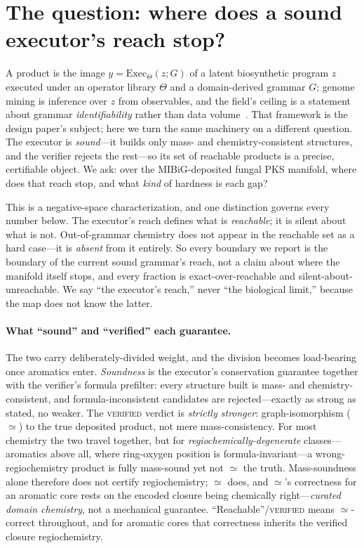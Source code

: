\documentclass[11pt]{article}
\begin{document}
\section{The question: where does a sound executor's reach stop?}
\label{sec:framing}
A product is the image $y=\mathrm{Exec}_{\Theta}(z;G)$ of a latent biosynthetic program $z$ executed
under an operator library $\Theta$ and a domain-derived grammar $G$; genome mining is inference over
$z$ from observables, and the field's ceiling is a statement about grammar \emph{identifiability}
rather than data volume~\citep{eilertsen2026preprint}. That framework is the design paper's subject;
here we turn the same machinery on a different question. The executor is \emph{sound}---it builds only
mass- and chemistry-consistent structures, and the verifier rejects the rest---so its set of reachable
products is a precise, certifiable object. We ask: over the MIBiG-deposited fungal PKS manifold, where
does that reach stop, and what \emph{kind} of hardness is each gap?

This is a negative-space characterization, and one distinction governs every number below. The
executor's reach defines what is \emph{reachable}; it is silent about what is not. Out-of-grammar
chemistry does not appear in the reachable set as a hard case---it is \emph{absent} from it entirely.
So every boundary we report is the boundary of the current sound grammar's reach, not a claim about
where the manifold itself stops, and every fraction is exact-over-reachable and silent-about-unreachable.
We say ``the executor's reach,'' never ``the biological limit,'' because the map does not know the latter.

\paragraph{What ``sound'' and ``verified'' each guarantee.} The two carry deliberately-divided weight,
and the division becomes load-bearing once aromatics enter. \emph{Soundness} is the executor's
conservation guarantee together with the verifier's formula prefilter: every structure built is mass-
and chemistry-consistent, and formula-inconsistent candidates are rejected---exactly as strong as
stated, no weaker. The \textsc{verified} verdict is \emph{strictly stronger}: graph-isomorphism
($\simeq$) to the true deposited product, not mere mass-consistency. For most chemistry the two travel
together, but for \emph{regiochemically-degenerate} classes---aromatics above all, where ring-oxygen
position is formula-invariant---a wrong-regiochemistry product is fully mass-sound yet not $\simeq$ the
truth. Mass-soundness alone therefore does not certify regiochemistry; $\simeq$ does, and $\simeq$'s
correctness for an aromatic core rests on the encoded closure being chemically right---\emph{curated
domain chemistry}, not a mechanical guarantee. ``Reachable''/\textsc{verified} means $\simeq$-correct
throughout, and for aromatic cores that correctness inherits the verified closure regiochemistry.
\end{document}
